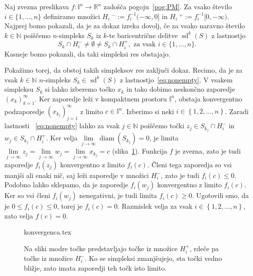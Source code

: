 \documentclass[mat1]{fmfdelo}
\newcommand{\R}{\mathbb R}
\newcommand{\N}{\mathbb N}
\DeclareMathOperator{\diam}{diam}
\DeclareMathOperator{\sd}{sd}
\newcommand{\I}{\mathbb I}
\newcommand{\0}{\underline{0}}
\begin{document}
\begin{dokaz}
Naj zvezna preslikava $f : \I^n \to  \R^n$ zadošča pogoju~\eqref{pog:PM}. Za vsako število $i \in \{ 1, \dots, n\}$ definiramo množici $H_i\ ^- := f_i^{-1} (-\infty, 0]$ in $H_i\ ^+ := f_i^{-1} [0, -\infty)$. Najprej bomo pokazali, da je za dokaz izreka dovolj, če za vsako naravno število $k \in \N$ poiščemo $n$-simpleks $S_k$ iz $k$-te baricentrične delitve $\sd^k(S)$ z lastnostjo 
\begin{equation}\label{eq:nonempty}
S_k \cap H_i^- \neq \emptyset \neq S_k \cap H_i^+, \text{ za vsak } i \in \{ 1, \dots, n \}.
\end{equation}
Kasneje bomo pokazali, da taki simpleksi res obstajajo.

Pokažimo torej, da obstoj takih simpleksov res zaključi dokaz. Recimo, da je za vsak $k \in \N$ $n$-simpleks $S_k \in \sd^k(S)$ z lastnostjo~\eqref{eq:nonempty}. V vsakem simpleksu $S_k$ si lahko izberemo točko $x_k$ in tako dobimo neskončno zaporedje $\left ( x_k \right ) _{k = 1}^{\infty}$. Ker zaporedje leži v kompaktnem prostoru $\I^n$, obstaja konvergentno podzaporedje $\left ( x_{k_j} \right ) _{j = 1}^{\infty}$ z limito $c \in \I^n$. Izberimo si neki $i \in \left \{1, 2, \dots, n\right \}$. Zaradi lastnosti ~\eqref{eq:nonempty} lahko za vsak $j \in \N$ poiščemo točki $z_j \in S_{k_j} \cap H_i^-$ in $w_j \in S_{k_j} \cap H_i^+$. Ker velja $\lim\limits_{j \to \infty} \diam(S_{k_j}) = 0$, je limita  $\lim\limits_{j \to \infty} z_j = \lim\limits_{j \to \infty} w_j = \lim\limits_{j \to \infty} x_{k_j} = c$ (slika~\ref{fig:istalimita}). Funkcija $f$ je zvezna, zato je tudi zaporedje $f_i(z_j)$ konvergentno z limito $f_i(c)$. Členi tega zaporedja so vsi manjši ali enaki nič, saj leži zaporedje v množici $H_i^-$, zato je tudi $f_i(c) \leq 0$. Podobno lahko sklepamo, da je zaporedje $f_i(w_j)$ konvergentno z limito $f_i(c)$. Ker so vsi členi $f_i(w_j)$ nenegativni, je tudi limita $f_i(c) \geq 0$. Ugotovili smo, da je $0 \leq f_i(c) \leq 0$, torej je $f_i(c) = 0$. Razmislek velja za vsak $i \in \left \{1, 2, \dots, n\right \}$, zato velja $f(c) = \0$.
\begin{figure}[h!]
	\centering
	{konvergenca.tex}%
	\caption{Na sliki modre točke predstavljajo točke iz množice $H_i^+$, rdeče pa točke iz množice $H_i^-$. Ko se simpleksi zmanjšujejo, sta točki vedno bližje, zato imata zaporedji teh točk isto limito.}\label{fig:istalimita}
\end{figure}

\end{dokaz}
\end{document}
